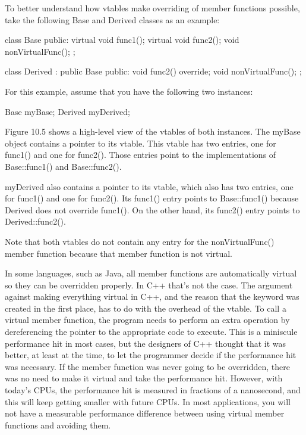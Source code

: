 To better understand how vtables make overriding of member functions possible, take the following Base and Derived classes as an example:

\begin{cpp}
class Base
{
    public:
        virtual void func1();
        virtual void func2();
        void nonVirtualFunc();
};

class Derived : public Base
{
    public:
        void func2() override;
        void nonVirtualFunc();
};
\end{cpp}

For this example, assume that you have the following two instances:

\begin{cpp}
Base myBase;
Derived myDerived;
\end{cpp}

Figure 10.5 shows a high-level view of the vtables of both instances. The myBase object contains a pointer to its vtable. This vtable has two entries, one for func1() and one for func2(). Those entries point to the implementations of Base::func1() and Base::func2().


myDerived also contains a pointer to its vtable, which also has two entries, one for func1() and one for func2(). Its func1() entry points to Base::func1() because Derived does not override func1(). On the other hand, its func2() entry points to Derived::func2().

Note that both vtables do not contain any entry for the nonVirtualFunc() member function because that member function is not virtual.


In some languages, such as Java, all member functions are automatically virtual so they can be overridden properly. In C++ that’s not the case. The argument against making everything virtual in C++, and the reason that the keyword was created in the first place, has to do with the overhead of the vtable. To call a virtual member function, the program needs to perform an extra operation by dereferencing the pointer to the appropriate code to execute. This is a miniscule performance hit in most cases, but the designers of C++ thought that it was better, at least at the time, to let the programmer decide if the performance hit was necessary. If the member function was never going to be overridden, there was no need to make it virtual and take the performance hit. However, with today’s CPUs, the performance hit is measured in fractions of a nanosecond, and this will keep getting smaller with future CPUs. In most applications, you will not have a measurable performance difference between using virtual member functions and avoiding them.

